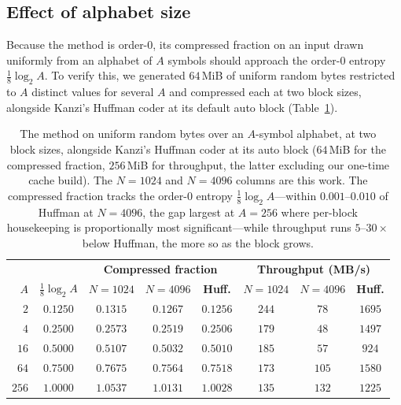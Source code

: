 \documentclass[entropy,article,submit,oneauthor,pdftex]{Definitions/mdpi}
\begin{document}
\subsection{Effect of alphabet size}
Because the method is order-$0$, its compressed fraction on an input drawn
uniformly from an alphabet of $A$ symbols should approach the order-$0$ entropy
$\tfrac{1}{8}\log_2 A$. To verify this, we generated $64$\,MiB of uniform random
bytes restricted to $A$ distinct values for several $A$ and compressed each at two
block sizes, alongside Kanzi's Huffman coder at its default auto block
(Table~\ref{tab:alphabet}).

\begin{table}[ht]
\centering
\renewcommand{\arraystretch}{1.15}
\caption{The method on uniform random bytes over an $A$-symbol alphabet, at two block sizes,
alongside Kanzi's Huffman coder at its auto block ($64$\,MiB for the compressed fraction,
$256$\,MiB for throughput, the latter excluding our one-time cache build). The $N{=}1024$
and $N{=}4096$ columns are this work. The compressed fraction tracks the order-$0$ entropy
$\tfrac18\log_2 A$---within $0.001$--$0.010$ of Huffman at $N{=}4096$, the gap largest at
$A{=}256$ where per-block housekeeping is proportionally most significant---while throughput
runs $5$--$30\times$ below Huffman, the more so as the block grows.}
\begin{tabular}{r c c c c c c c}
\toprule
 & & \multicolumn{3}{c}{\textbf{Compressed fraction}} & \multicolumn{3}{c}{\textbf{Throughput (MB/s)}} \\
\cmidrule(lr){3-5}\cmidrule(lr){6-8}
\textbf{$A$} & $\tfrac{1}{8}\log_2 A$ & \textbf{$N{=}1024$} & \textbf{$N{=}4096$} & \textbf{Huff.} & \textbf{$N{=}1024$} & \textbf{$N{=}4096$} & \textbf{Huff.} \\
\midrule
$2$   & $0.1250$ & $0.1315$ & $0.1267$ & $0.1256$ & $244$ & $78$  & $1695$ \\
$4$   & $0.2500$ & $0.2573$ & $0.2519$ & $0.2506$ & $179$ & $48$  & $1497$ \\
$16$  & $0.5000$ & $0.5107$ & $0.5032$ & $0.5010$ & $185$ & $57$  & $924$  \\
$64$  & $0.7500$ & $0.7675$ & $0.7564$ & $0.7518$ & $173$ & $105$ & $1580$ \\
$256$ & $1.0000$ & $1.0537$ & $1.0131$ & $1.0028$ & $135$ & $132$ & $1225$ \\
\bottomrule
\end{tabular}
\label{tab:alphabet}
\end{table}
\end{document}

